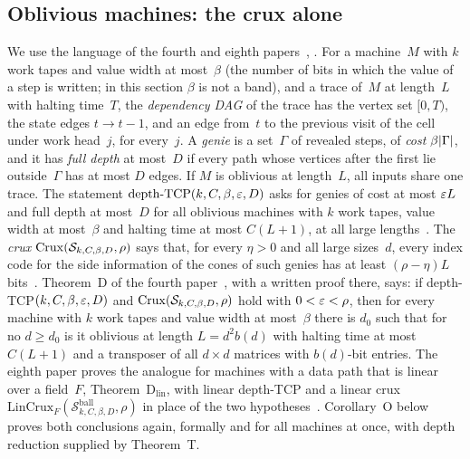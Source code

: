 \subsection{Oblivious machines: the crux alone}\label{sec:cons-machines}

We use the language of the fourth and eighth papers~\cite[Section~4]{FourthPaper2026}, \cite[Section~2.4]{EighthPaper2026}.
For a machine~$M$ with $k$ work tapes and value width at most~$\beta$ (the number of bits in which the value of a step is
written; in this section $\beta$ is not a band), and a trace of~$M$ at length~$L$ with halting time~$T$, the \emph{dependency
DAG} of the trace has the vertex set $[0,T)$, the state edges $t\to t-1$, and an edge from~$t$ to the previous visit of the cell
under work head~$j$, for every~$j$. A \emph{genie} is a set~$\Gamma$ of revealed steps, of \emph{cost} $\beta\lvert \Gamma \rvert$, and it
has \emph{full depth} at most~$D$ if every path whose vertices after the first lie outside~$\Gamma$ has at most $D$ edges. If $M$
is oblivious at length~$L$, all inputs share one trace. The statement $\mathrm{depth}\text{-}\mathrm{TCP}(k,C,\beta,\varepsilon,D)$ asks for
genies of cost at most $\varepsilon L$ and full depth at most~$D$ for all oblivious machines with $k$ work tapes, value width at
most~$\beta$ and halting time at most $C(L+1)$, at all large lengths~\cite[Definition~4.7]{FourthPaper2026}. The \emph{crux}
$\mathrm{Crux}(\mathcal S_{k,C,\beta,D},\rho)$ says that, for every $\eta>0$ and all large sizes~$d$, every index code for the side
information of the cones of such genies has at least $(\rho-\eta)L$ bits~\cite[Definition~4.8]{FourthPaper2026}. Theorem~D
of the fourth paper~\cite[Theorem~4.10]{FourthPaper2026}, with a written proof there, says: if depth-TCP$(k,C,\beta,\varepsilon,D)$ and
$\mathrm{Crux}(\mathcal S_{k,C,\beta,D},\rho)$ hold with $0<\varepsilon<\rho$, then for every machine with $k$ work tapes and value width at
most~$\beta$ there is $d_0$ such that for no $d\ge d_0$ is it oblivious at length $L=d^2b(d)$ with halting time at most
$C(L+1)$ and a transposer of all $d\times d$ matrices with $b(d)$-bit entries. The eighth paper proves the analogue for machines
with a data path that is linear over a field~$F$, Theorem~$\mathrm{D}_{\mathrm{lin}}$, with linear depth-TCP and a linear crux
$\mathrm{LinCrux}_F(\mathcal S^{\mathrm{ball}}_{k,C,\beta,D},\rho)$ in place of the two
hypotheses~\cite[Definition~7.4 and Theorem~7.5]{EighthPaper2026}. Corollary~O below proves both conclusions again, formally and
for all machines at once, with depth reduction supplied by Theorem~T.

